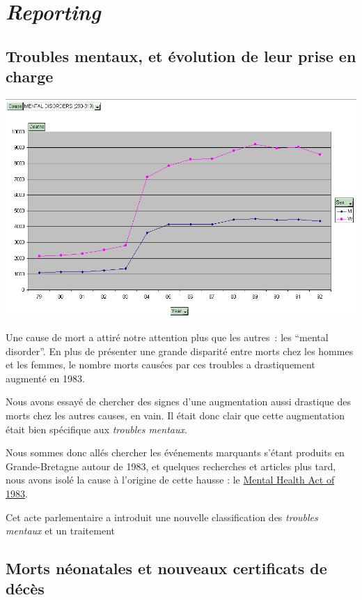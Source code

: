 \chapter{\textit{Reporting}}

\section{Troubles mentaux, et évolution de leur prise en charge}

    \includegraphics[scale=0.5]{images/mental_disorder.png}

    Une cause de mort a attiré notre attention plus que les autres~: les ``mental disorder''. En plus de présenter une grande disparité
    entre morts chez les hommes et les femmes, le nombre morts causées par ces troubles a drastiquement augmenté en 1983.

    Nous avons essayé de chercher des signes d'une augmentation aussi drastique des morts chez les autres causes, en vain. Il était donc
    clair que cette augmentation était bien spécifique aux \textit{troubles mentaux}.

    Nous sommes donc allés chercher les événements marquants s'étant produits en Grande-Bretagne autour de 1983, et quelques recherches
    et articles plus tard, nous avons isolé la cause à l'origine de cette hausse : le \href{en.wikipedia.org/wiki/Mental_Health_Act_1983‎}{Mental Health Act of 1983}.

    Cet acte parlementaire a introduit une nouvelle classification des \textit{troubles mentaux} et un traitement

\section{Morts néonatales et nouveaux certificats de décès}

